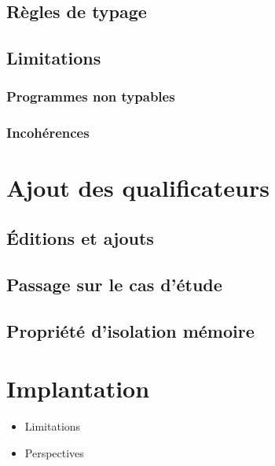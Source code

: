 \documentclass{phdthesis}
\begin{document}
\section{Règles de typage}
\section{Limitations}
\subsection{Programmes non typables}
\subsection{Incohérences}

\chapter{Ajout des qualificateurs}

\section{Éditions et ajouts}
\section{Passage sur le cas d'étude}
\section{Propriété d'isolation mémoire}

\chapter{Implantation}


\begin{itemize}
  \item Limitations
  \item Perspectives
\end{itemize}




\end{document}
